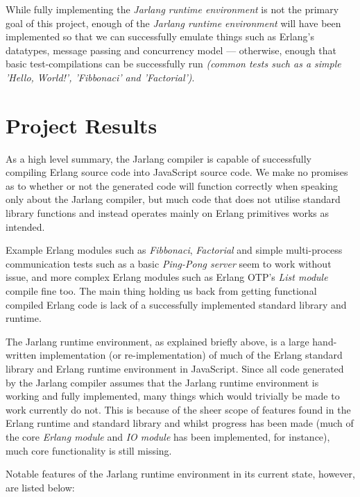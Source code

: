 \documentclass[twoside,12pt,titlepage,a4paper]{article}
\begin{document}
While fully implementing the \textit{Jarlang runtime environment} is not the primary goal of this project, enough of the \textit{Jarlang runtime environment} will have been implemented so that we can successfully emulate things such as Erlang's datatypes, message passing and concurrency model --- otherwise, enough that basic test-compilations can be successfully run \textit{(common tests such as a simple 'Hello, World!', 'Fibbonaci' and 'Factorial')}.

\section{Project Results}
\label{Results}
As a high level summary, the Jarlang compiler is capable of successfully compiling Erlang source code into JavaScript source code. We make no promises as to whether or not the generated code will function correctly when speaking only about the Jarlang compiler, but much code that does not utilise standard library functions and instead operates mainly on Erlang primitives works as intended.

Example Erlang modules such as \textit{Fibbonaci}, \textit{Factorial} and simple multi-process communication tests such as a basic \textit{Ping-Pong server} seem to work without issue, and more complex Erlang modules such as Erlang OTP's \textit{List module} compile fine too. The main thing holding us back from getting functional compiled Erlang code is lack of a successfully implemented standard library and runtime.

The Jarlang runtime environment, as explained briefly above, is a large hand-written implementation (or re-implementation) of much of the Erlang standard library and Erlang runtime environment in JavaScript. Since all code generated by the Jarlang compiler assumes that the Jarlang runtime environment is working and fully implemented, many things which would trivially be made to work currently do not. This is because of the sheer scope of features found in the Erlang runtime and standard library and whilst progress has been made (much of the core \textit{Erlang module} and \textit{IO module} has been implemented, for instance), much core functionality is still missing.

Notable features of the Jarlang runtime environment in its current state, however, are listed below:
\end{document}
